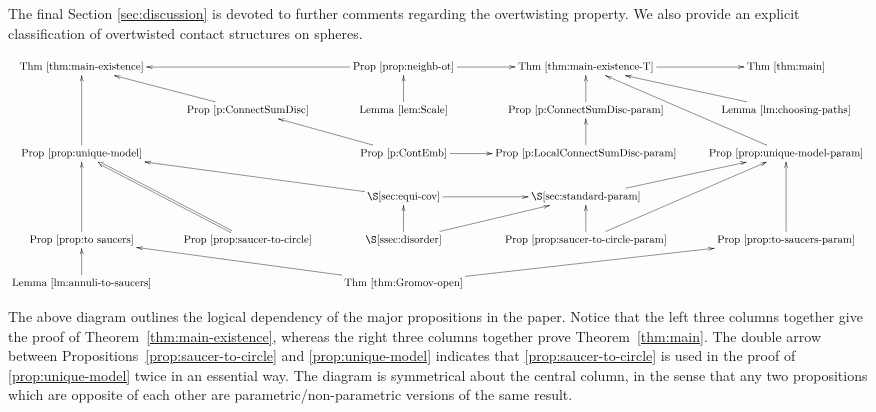 \documentclass[12pt]{paper}
\theoremstyle{plain}
\theoremstyle{definition}
\numberwithin{figure}{section}
\begin{document}
The final Section \ref{sec:discussion} is devoted to further comments regarding the overtwisting property. We also provide an explicit classification of overtwisted contact structures on spheres.
 
\begin{displaymath}
\xymatrix{
\text{Thm } \ref{thm:main-existence}  && \text{Prop } \ref{prop:neighb-ot} \ar[ll] \ar[r] & \text{Thm }\ref{thm:main-existence-T} \ar[r] & \text{Thm } \ref{thm:main} \\ 
&\text{Prop } \ref{p:ConnectSumDisc} \ar[ul] & \text{Lemma } \ref{lem:Scale} \ar[u] & \text{Prop } \ref{p:ConnectSumDisc-param}\ar[u] & \text{Lemma } \ref{lm:choosing-paths} \ar[ul] \\
\text{Prop } \ref{prop:unique-model} \ar[uu] && \text{Prop } \ref{p:ContEmb} \ar[ul] \ar[r] & \text{Prop } \ref{p:LocalConnectSumDisc-param} \ar[u] & \text{Prop } \ref{prop:unique-model-param} \ar[uul]\\
&& \S \ref{sec:equi-cov} \ar[ull] \ar[r] & \S \ref{sec:standard-param} \ar[ur] \\
\text{Prop } \ref{prop:to saucers} \ar[uu] & \text{Prop } \ref{prop:saucer-to-circle} \ar@2{->}[uul] & \S \ref{ssec:disorder} \ar[u] \ar[ur] & \text{Prop } \ref{prop:saucer-to-circle-param} \ar[u] \ar[uur] & \text{Prop } \ref{prop:to-saucers-param} \ar[uu] \\
\text{Lemma }\ref{lm:annuli-to-saucers} \ar[u] && \text{Thm } \ref{thm:Gromov-open} \ar[ull] \ar[urr]
}
\end{displaymath} 


 
The above diagram outlines the logical dependency of the major propositions in the paper. Notice that the left three columns together give the proof of Theorem~\ref{thm:main-existence}, whereas the right three columns together prove Theorem~\ref{thm:main}.  The double arrow between Propositions~\ref{prop:saucer-to-circle} and \ref{prop:unique-model} indicates that \ref{prop:saucer-to-circle} is used in the proof of \ref{prop:unique-model}  twice in an essential way. The diagram is symmetrical about the central column, in the sense that any two propositions which are opposite of each other are parametric/non-parametric versions of the same result.


 
\end{document}
